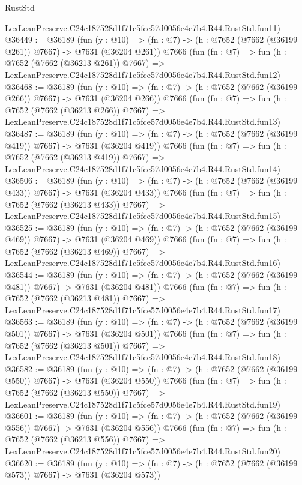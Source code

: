 \begin{lexlean}{RustStd}
\begin{coremodule}
    LexLeanPreserve.C24c187528d1f71c5fce57d0056e4e7b4.R44.RustStd.fun11)
@36449 := @36189
    (fun (y : @10) => (fn : @7) -> (h : @7652 (@7662 (@36199 @261)) @7667) -> @7631 (@36204 @261))
    @7666
    (fun (fn : @7) =>
    fun (h : @7652 (@7662 (@36213 @261)) @7667) =>
    LexLeanPreserve.C24c187528d1f71c5fce57d0056e4e7b4.R44.RustStd.fun12)
@36468 := @36189
    (fun (y : @10) => (fn : @7) -> (h : @7652 (@7662 (@36199 @266)) @7667) -> @7631 (@36204 @266))
    @7666
    (fun (fn : @7) =>
    fun (h : @7652 (@7662 (@36213 @266)) @7667) =>
    LexLeanPreserve.C24c187528d1f71c5fce57d0056e4e7b4.R44.RustStd.fun13)
@36487 := @36189
    (fun (y : @10) => (fn : @7) -> (h : @7652 (@7662 (@36199 @419)) @7667) -> @7631 (@36204 @419))
    @7666
    (fun (fn : @7) =>
    fun (h : @7652 (@7662 (@36213 @419)) @7667) =>
    LexLeanPreserve.C24c187528d1f71c5fce57d0056e4e7b4.R44.RustStd.fun14)
@36506 := @36189
    (fun (y : @10) => (fn : @7) -> (h : @7652 (@7662 (@36199 @433)) @7667) -> @7631 (@36204 @433))
    @7666
    (fun (fn : @7) =>
    fun (h : @7652 (@7662 (@36213 @433)) @7667) =>
    LexLeanPreserve.C24c187528d1f71c5fce57d0056e4e7b4.R44.RustStd.fun15)
@36525 := @36189
    (fun (y : @10) => (fn : @7) -> (h : @7652 (@7662 (@36199 @469)) @7667) -> @7631 (@36204 @469))
    @7666
    (fun (fn : @7) =>
    fun (h : @7652 (@7662 (@36213 @469)) @7667) =>
    LexLeanPreserve.C24c187528d1f71c5fce57d0056e4e7b4.R44.RustStd.fun16)
@36544 := @36189
    (fun (y : @10) => (fn : @7) -> (h : @7652 (@7662 (@36199 @481)) @7667) -> @7631 (@36204 @481))
    @7666
    (fun (fn : @7) =>
    fun (h : @7652 (@7662 (@36213 @481)) @7667) =>
    LexLeanPreserve.C24c187528d1f71c5fce57d0056e4e7b4.R44.RustStd.fun17)
@36563 := @36189
    (fun (y : @10) => (fn : @7) -> (h : @7652 (@7662 (@36199 @501)) @7667) -> @7631 (@36204 @501))
    @7666
    (fun (fn : @7) =>
    fun (h : @7652 (@7662 (@36213 @501)) @7667) =>
    LexLeanPreserve.C24c187528d1f71c5fce57d0056e4e7b4.R44.RustStd.fun18)
@36582 := @36189
    (fun (y : @10) => (fn : @7) -> (h : @7652 (@7662 (@36199 @550)) @7667) -> @7631 (@36204 @550))
    @7666
    (fun (fn : @7) =>
    fun (h : @7652 (@7662 (@36213 @550)) @7667) =>
    LexLeanPreserve.C24c187528d1f71c5fce57d0056e4e7b4.R44.RustStd.fun19)
@36601 := @36189
    (fun (y : @10) => (fn : @7) -> (h : @7652 (@7662 (@36199 @556)) @7667) -> @7631 (@36204 @556))
    @7666
    (fun (fn : @7) =>
    fun (h : @7652 (@7662 (@36213 @556)) @7667) =>
    LexLeanPreserve.C24c187528d1f71c5fce57d0056e4e7b4.R44.RustStd.fun20)
@36620 := @36189
    (fun (y : @10) => (fn : @7) -> (h : @7652 (@7662 (@36199 @573)) @7667) -> @7631 (@36204 @573))

\end{coremodule}
\end{lexlean}
